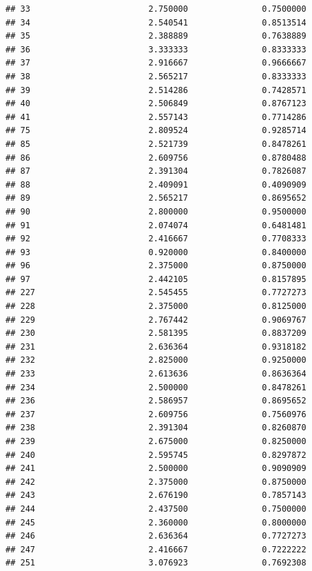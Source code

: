 \documentclass[]{article}
\begin{document}
\begin{verbatim}
## 33                        2.750000               0.7500000
## 34                        2.540541               0.8513514
## 35                        2.388889               0.7638889
## 36                        3.333333               0.8333333
## 37                        2.916667               0.9666667
## 38                        2.565217               0.8333333
## 39                        2.514286               0.7428571
## 40                        2.506849               0.8767123
## 41                        2.557143               0.7714286
## 75                        2.809524               0.9285714
## 85                        2.521739               0.8478261
## 86                        2.609756               0.8780488
## 87                        2.391304               0.7826087
## 88                        2.409091               0.4090909
## 89                        2.565217               0.8695652
## 90                        2.800000               0.9500000
## 91                        2.074074               0.6481481
## 92                        2.416667               0.7708333
## 93                        0.920000               0.8400000
## 96                        2.375000               0.8750000
## 97                        2.442105               0.8157895
## 227                       2.545455               0.7727273
## 228                       2.375000               0.8125000
## 229                       2.767442               0.9069767
## 230                       2.581395               0.8837209
## 231                       2.636364               0.9318182
## 232                       2.825000               0.9250000
## 233                       2.613636               0.8636364
## 234                       2.500000               0.8478261
## 236                       2.586957               0.8695652
## 237                       2.609756               0.7560976
## 238                       2.391304               0.8260870
## 239                       2.675000               0.8250000
## 240                       2.595745               0.8297872
## 241                       2.500000               0.9090909
## 242                       2.375000               0.8750000
## 243                       2.676190               0.7857143
## 244                       2.437500               0.7500000
## 245                       2.360000               0.8000000
## 246                       2.636364               0.7727273
## 247                       2.416667               0.7222222
## 251                       3.076923               0.7692308

\end{verbatim}
\end{document}

